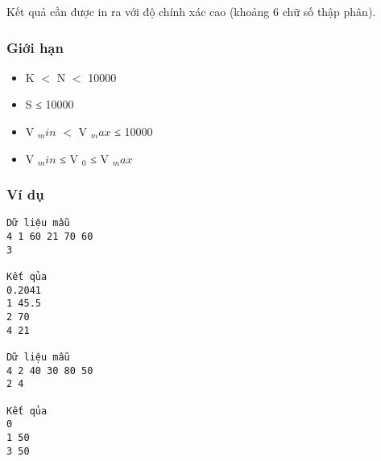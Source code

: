    Kết quả cần được in ra với độ chính xác cao (khoảng 6 chữ số thập phân).  

\subsubsection{   Giới hạn  }
\begin{itemize}
	\item     K $<$ N $<$ 10000   
	\item     S ≤ 10000   
	\item     V    $_     min    $    $<$ V    $_     max    $    ≤ 10000   
	\item     V    $_     min    $    ≤ V    $_     0    $    ≤ V    $_     max    $
\end{itemize}

\subsubsection{   Ví dụ  }
\begin{verbatim}
Dữ liệu mẫu
4 1 60 21 70 60
3

Kết qủa
0.2041
1 45.5
2 70
4 21

Dữ liệu mẫu
4 2 40 30 80 50
2 4

Kết qủa
0
1 50
3 50
\end{verbatim}

